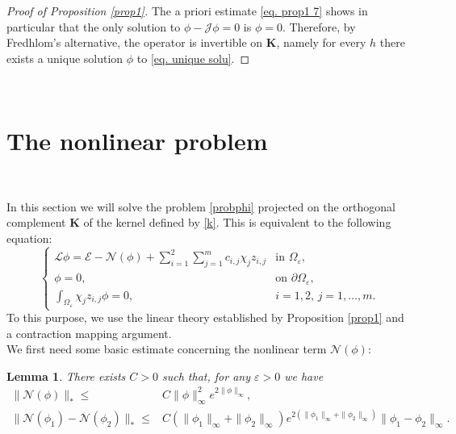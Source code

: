 \documentclass[11pt]{article}
\newtheorem{lemma}{Lemma}[section]
\begin{document}
\begin{proof}[Proof of Proposition \ref{prop1}]
The a priori estimate \eqref{eq. prop1 7} shows in particular that the only solution to $\phi-\mathcal J\phi=0$ is $\phi=0$. Therefore, by Fredhlom's alternative, the operator is invertible on $\mathbf K$, namely for every $h$ there exists a unique solution $\phi$ to \eqref{eq. unique solu}.
\end{proof}\

\section{The nonlinear problem}\

In this section we will solve the problem \eqref{probphi} projected on the orthogonal complement $\mathbf K$ of the kernel defined by \eqref{k}. This is equivalent to the following equation:
\begin{equation}\label{eq. projected}
\left\{\begin{array}{ll}
\mathcal L\phi=\mathcal E-\mathcal N(\phi)+\sum_{i=1}^2\sum_{j=1}^mc_{i,j}\chi_jz_{i,j}&\text{in }\Omega_\varepsilon,\\
\phi=0,&\text{on }\partial\Omega_\varepsilon,\\
\int_{\Omega_\varepsilon}\chi_jz_{i,j}\phi=0,&i=1,2,\,j=1,\dots,m.
\end{array}\right.
\end{equation}
To this purpose, we use the linear theory established by Proposition \ref{prop1} and a contraction mapping argument.\\

We first need some basic estimate concerning the nonlinear term $\mathcal N(\phi)$:

\begin{lemma}\label{le. estimate of N}
There exists $C>0$ such that, for any $\varepsilon>0$ we have
\begin{align*}
\|\mathcal N(\phi)\|_\ast\le&C\|\phi\|^2_\infty e^{2\|\phi\|_\infty},\\
\|\mathcal N(\phi_1)-\mathcal N(\phi_2)\|_\ast\le&C(\|\phi_1\|_\infty+\|\phi_2\|_\infty)e^{2(\|\phi_1\|_\infty+\|\phi_2\|_\infty)}\|\phi_1-\phi_2\|_\infty.
\end{align*}
\end{lemma}
\end{document}
